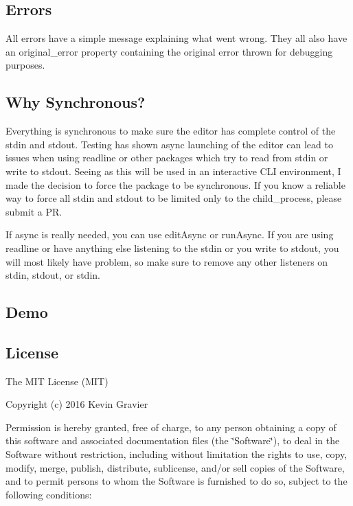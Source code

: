 \subsection*{Errors}

All errors have a simple message explaining what went wrong. They all also have an {\ttfamily original\+\_\+error} property containing the original error thrown for debugging purposes.

\subsection*{Why Synchronous?}

Everything is synchronous to make sure the editor has complete control of the stdin and stdout. Testing has shown async launching of the editor can lead to issues when using readline or other packages which try to read from stdin or write to stdout. Seeing as this will be used in an interactive C\+LI environment, I made the decision to force the package to be synchronous. If you know a reliable way to force all stdin and stdout to be limited only to the child\+\_\+process, please submit a PR.

If async is really needed, you can use {\ttfamily edit\+Async} or {\ttfamily run\+Async}. If you are using readline or have anything else listening to the stdin or you write to stdout, you will most likely have problem, so make sure to remove any other listeners on stdin, stdout, or stdin.

\subsection*{Demo}

\href{https://asciinema.org/a/a1qh9lypbe65mj0ivfuoslz2s}{\tt }

\subsection*{License}

The M\+IT License (M\+IT)

Copyright (c) 2016 Kevin Gravier

Permission is hereby granted, free of charge, to any person obtaining a copy of this software and associated documentation files (the \char`\"{}\+Software\char`\"{}), to deal in the Software without restriction, including without limitation the rights to use, copy, modify, merge, publish, distribute, sublicense, and/or sell copies of the Software, and to permit persons to whom the Software is furnished to do so, subject to the following conditions\+:

